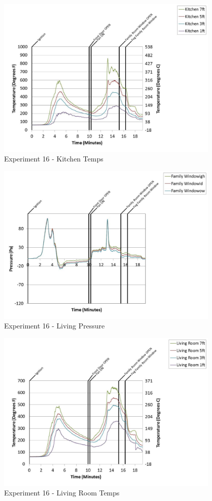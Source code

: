 \documentclass{article}
\begin{document}
\begin{appendices}
	\begin{figure}[h!]
		\centering
		\includegraphics[height=3.05in]{0_Images/Results_Charts/Exp_16_Charts/KitchenTemps.pdf}
		\caption{Experiment 16 - Kitchen Temps}
	\end{figure}
 
	\clearpage

	\begin{figure}[h!]
		\centering
		\includegraphics[height=3.05in]{0_Images/Results_Charts/Exp_16_Charts/LivingPressure.pdf}
		\caption{Experiment 16 - Living Pressure}
	\end{figure}
 

	\begin{figure}[h!]
		\centering
		\includegraphics[height=3.05in]{0_Images/Results_Charts/Exp_16_Charts/LivingRoomTemps.pdf}
		\caption{Experiment 16 - Living Room Temps}
	\end{figure}
 

\end{appendices}
\end{document}
